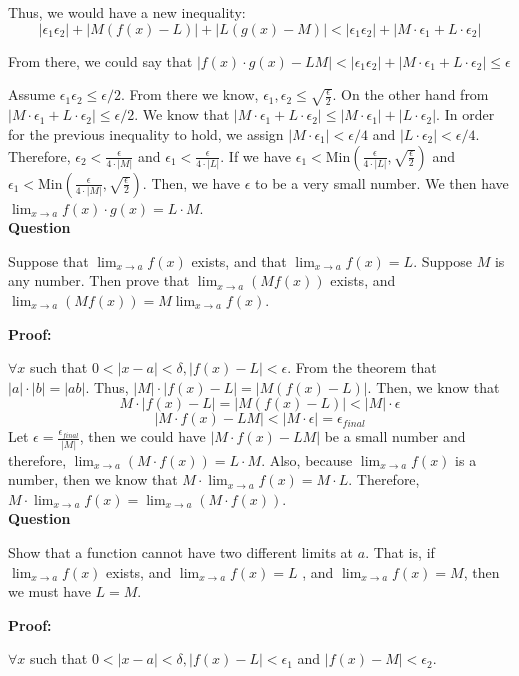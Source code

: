 \documentclass[a4paper,12pt]{report}
\begin{document}
\noindent
Thus, we would have a new inequality:
\[|\epsilon_1\epsilon_2|+|M(f(x)-L)|+|L(g(x)-M)|<|\epsilon_1\epsilon_2|+|M\cdot{\epsilon_1}+L\cdot{\epsilon_2}|\]

\noindent
From there, we could say that $|f(x)\cdot{g(x)}-LM|<|\epsilon_1\epsilon_2|+|M\cdot{\epsilon_1}+L\cdot{\epsilon_2}|\leq \epsilon$

\noindent
Assume $\epsilon_1\epsilon_2\leq \epsilon/2$. From there we know, $\epsilon_1, \epsilon_2 \leq \sqrt{\frac{\epsilon}{2}}$. On the other hand from $|M\cdot{\epsilon_1}+L\cdot{\epsilon_2}|\leq \epsilon/2$. We know that $|M\cdot{\epsilon_1}+L\cdot{\epsilon_2}|\leq |M\cdot{\epsilon_1}|+|L\cdot{\epsilon_2}|$. In order for the previous inequality to hold, we assign $|M\cdot{\epsilon_1}|<\epsilon/4$ and $|L\cdot{\epsilon_2}|<\epsilon/4$. Therefore, $\epsilon_2<\frac{\epsilon}{4\cdot{|M|}}$ and $\epsilon_1<\frac{\epsilon}{4\cdot{|L|}}$. If we have $\epsilon_1<\text{Min}(\frac{\epsilon}{4\cdot{|L|}}, \sqrt{\frac{\epsilon}{2}})$ and $\epsilon_1<\text{Min}(\frac{\epsilon}{4\cdot{|M|}}, \sqrt{\frac{\epsilon}{2}})$. Then, we have $\epsilon$ to be a very small number. We then have $\lim_{x\to a} f(x)\cdot{g(x)}=L\cdot{M}$.\\

\noindent
\textbf{Question}

\noindent
Suppose that $\displaystyle{\lim_{x\to a}}f(x)$
exists, and that
$\displaystyle{\lim_{x\to a}}f(x)=L$. Suppose $M$ is any 
number.
Then prove that $\displaystyle{\lim_{x\to a}}(Mf(x))$
exists, and $\displaystyle{\lim_{x\to a}}(Mf(x))=M\displaystyle{\lim_{x\to a}}f(x)$.

\noindent
\textbf{Proof: }

\noindent
$\forall x $ such that $0<|x-a|<\delta, |f(x)-L|< \epsilon$. From the theorem that $|a|\cdot{|b|}=|ab|$. Thus, $|M|\cdot{|f(x)-L|}=|M(f(x)-L)|$. Then, we know that 
\[M\cdot{|f(x)-L|}=|M(f(x)-L)|<|M|\cdot{\epsilon}\]
\[|M\cdot{f(x)}-LM|<|M\cdot{\epsilon}|=\epsilon_{final}\]
Let $\epsilon=\frac{\epsilon_{final}}{|M|}$, then we could have $|M\cdot{f(x)}-LM|$ be a small number and therefore, $\lim_{x\to a}(M\cdot{f(x)})=L\cdot{M}$. Also, because $\lim_{x\to a}f(x)$ is a number, then we know that $M\cdot{\lim_{x\to a}f(x)}=M\cdot{L}$. Therefore, $M\cdot{\lim_{x\to a}f(x)}=\lim_{x\to a}(M\cdot{f(x)})$.\\

\noindent
\textbf{Question}

\noindent
Show that a function cannot
have two different limits at $a$. That is, 
if $\displaystyle{\lim_{x\to a}}f(x)$ exists, and 
$\displaystyle{\lim_{x\to a}}f(x)=L$ , and
$\displaystyle{\lim_{x\to a}}f(x)=M$, then we
must have $L=M$.

\noindent
\textbf{Proof: }

\noindent
$\forall x $ such that $0<|x-a|<\delta, |f(x)-L|< \epsilon_1$ and $|f(x)-M|< \epsilon_2$. 
\end{document}

